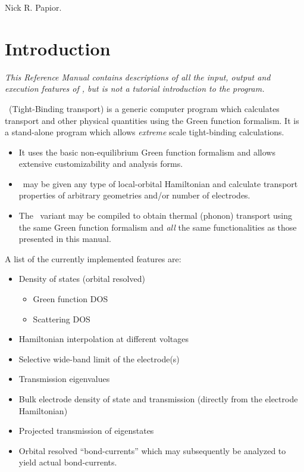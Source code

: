 Nick R. Papior.


\tableofcontents

\newpage

\section{Introduction}

\textit{This Reference Manual contains descriptions of all the input,
    output and execution features of \tbtrans, but is not a tutorial
    introduction to the program.}

\tbtrans\ (Tight-Binding transport) is a generic computer program
which calculates transport and other physical quantities using the
Green function formalism. 
%
It is a stand-alone program which allows \emph{extreme} scale
tight-binding calculations. 
\begin{itemize}
  
  \item%
  It uses the basic non-equilibrium Green function formalism and
  allows extensive customizability and analysis forms.

  \item%
  \tbtrans\ may be given any type of local-orbital Hamiltonian and
  calculate transport properties of arbitrary geometries and/or number
  of electrodes. 

  \item%
  The \phtrans\ variant may be compiled to obtain thermal (phonon)
  transport using the same Green function formalism and \emph{all} the
  same functionalities as those presented in this manual.

\end{itemize}

A list of the currently implemented features are:
\begin{itemize}

  \item Density of states (orbital resolved)
  \begin{itemize}
    \item Green function DOS
    \item Scattering DOS
  \end{itemize}

  \item Hamiltonian interpolation at different voltages

  \item Selective wide-band limit of the electrode(s)

  \item Transmission eigenvalues

  \item Bulk electrode density of state and transmission (directly
  from the electrode Hamiltonian)

  \item Projected transmission of eigenstates

  \item Orbital resolved ``bond-currents'' which may subsequently be
  analyzed to yield actual bond-currents.
  
\end{itemize}


